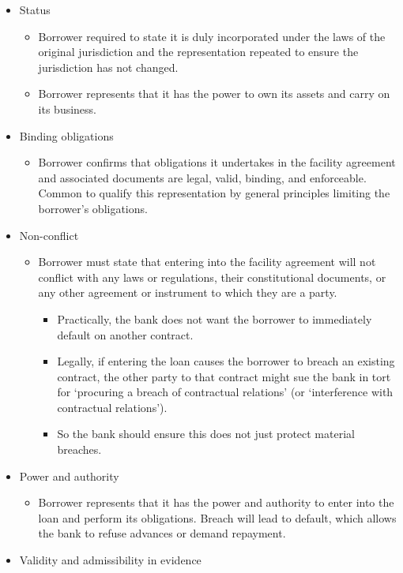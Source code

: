 \documentclass[
]{article}
\providecommand{\tightlist}{%
  \setlength{\itemsep}{0pt}\setlength{\parskip}{0pt}}
\begin{document}
\begin{itemize}
\tightlist
\item
  Status

  \begin{itemize}
  \tightlist
  \item
    Borrower required to state it is duly incorporated under the laws of
    the original jurisdiction and the representation repeated to ensure
    the jurisdiction has not changed.
  \item
    Borrower represents that it has the power to own its assets and
    carry on its business.
  \end{itemize}
\item
  Binding obligations

  \begin{itemize}
  \tightlist
  \item
    Borrower confirms that obligations it undertakes in the facility
    agreement and associated documents are legal, valid, binding, and
    enforceable. Common to qualify this representation by general
    principles limiting the borrower's obligations.
  \end{itemize}
\item
  Non-conflict

  \begin{itemize}
  \tightlist
  \item
    Borrower must state that entering into the facility agreement will
    not conflict with any laws or regulations, their constitutional
    documents, or any other agreement or instrument to which they are a
    party.

    \begin{itemize}
    \tightlist
    \item
      Practically, the bank does not want the borrower to immediately
      default on another contract.
    \item
      Legally, if entering the loan causes the borrower to breach an
      existing contract, the other party to that contract might sue the
      bank in tort for `procuring a breach of contractual relations' (or
      `interference with contractual relations').
    \item
      So the bank should ensure this does not just protect material
      breaches.
    \end{itemize}
  \end{itemize}
\item
  Power and authority

  \begin{itemize}
  \tightlist
  \item
    Borrower represents that it has the power and authority to enter
    into the loan and perform its obligations. Breach will lead to
    default, which allows the bank to refuse advances or demand
    repayment.
  \end{itemize}
\item
  Validity and admissibility in evidence


\end{itemize}
\end{document}
